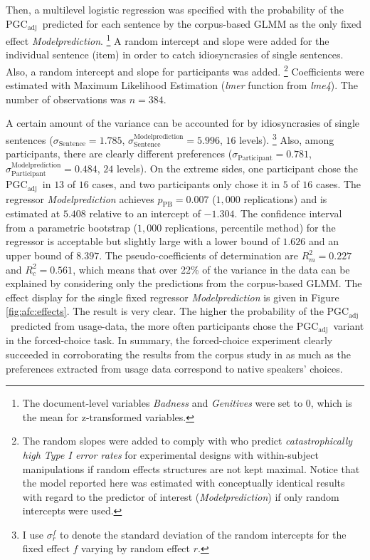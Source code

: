 \documentclass[USenglish]{article}
\newcommand{\Sub}[1]{\ensuremath{\mathrm{_{#1}}}}
\newcommand{\mpPB}{\ensuremath{p_{\text{PB}}}}
\newcommand{\PGCa}{PGC\Sub{adj}}
\begin{document}
Then, a multilevel logistic regression was specified with the probability of the \PGCa\ predicted for each sentence by the corpus-based GLMM as the only fixed effect \textit{Modelprediction}.%
\footnote{The document-level variables \textit{Badness} and \textit{Genitives} were set to $0$, which is the mean for z-transformed variables.}
A random intercept and slope were added for the individual sentence (item) in order to catch idiosyncrasies of single sentences.
Also, a random intercept and slope for participants was added.%
\footnote{The random slopes were added to comply with \citet[257]{BarrEa2013} who predict \textit{catastrophically high Type I error rates} for experimental designs with within-subject manipulations if random effects structures are not kept maximal.
Notice that the model reported here was estimated with conceptually identical results with regard to the predictor of interest (\textit{Modelprediction}) if only random intercepts were used.}
Coefficients were estimated with Maximum Likelihood Estimation (\textit{lmer} function from \textit{lme4}).
The number of observations was $n=384$.

A certain amount of the variance can be accounted for by idiosyncrasies of single sentences ($\sigma_{\text{Sentence}}=1.785$, $\sigma^{\text{Modelprediction}}_{\text{Sentence}}=5.996$, $16$ levels).%
\footnote{I use $\sigma^f_r$ to denote the standard deviation of the random intercepts for the fixed effect $f$ varying by random effect $r$.}
Also, among participants, there are clearly different preferences ($\sigma_{\text{Participant}}=0.781$, $\sigma^{\text{Modelprediction}}_{\text{Participant}}=0.484$, $24$ levels).
On the extreme sides, one participant chose the \PGCa\ in $13$ of $16$ cases, and two participants only chose it in $5$ of $16$ cases.
The regressor \textit{Modelprediction} achieves $\mpPB=0.007$ ($1,000$ replications) and is estimated at $5.408$ relative to an intercept of $-1.304$.
The confidence interval from a parametric bootstrap ($1,000$ replications, percentile method) for the regressor is acceptable but slightly large with a lower bound of $1.626$ and an upper bound of $8.397$.
The pseudo-coefficients of determination are $R^2_{m}=0.227$ and $R^2_{c}=0.561$, which means that over 22\% of the variance in the data can be explained by considering only the predictions from the corpus-based GLMM.
The effect display for the single fixed regressor \textit{Modelprediction} is given in Figure \ref{fig:afc:effects}.
The result is very clear.
The higher the probability of the \PGCa\ predicted from usage-data, the more often participants chose the \PGCa\ variant in the forced-choice task.
In summary, the forced-choice experiment clearly succeeded in corroborating the results from the corpus study in as much as the preferences extracted from usage data correspond to native speakers' choices.
\end{document}
